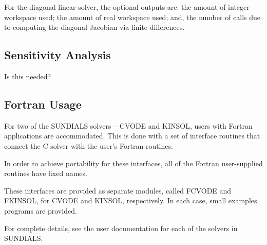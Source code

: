 For the diagonal linear solver, the optional outputs are: the amount
of integer workspace used; the amount of real workspace used; and, the
number of calls due to computing the diagonal Jacobian via finite differences.

\subsection{Sensitivity Analysis}
\label{ss:sensitivity_analysis}

{\sf Is this needed?}

\subsection{Fortran Usage} 
\label{ss:Fortran_usage}

For two of the SUNDIALS solvers -- CVODE and KINSOL, users with
Fortran applications are accommodated.  This is done with a set of
interface routines that connect the C solver with the user's Fortran
routines.

In order to achieve portability for these interfaces, all of the
Fortran user-supplied routines have fixed names.

These interfaces are provided as separate modules, called FCVODE and
FKINSOL, for CVODE and KINSOL, respectively.  In each case, small
examples programs are provided.

For complete details,
see the user documentation for each of the solvers in SUNDIALS.




